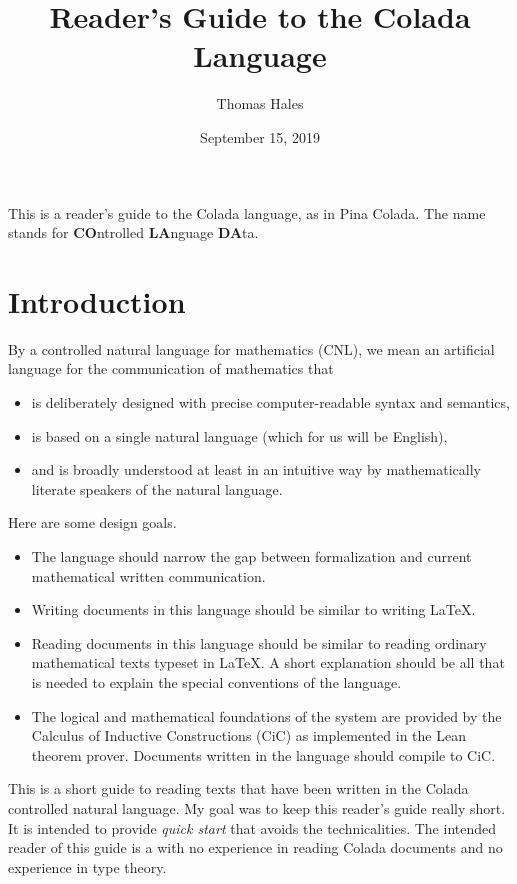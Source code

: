 \documentclass[12pt]{article}
\title{Reader's Guide to the Colada Language}
\date{September 15, 2019}
\author{Thomas Hales}
\numberwithin{definition}{section}
\begin{document}
\maketitle

\setcounter{tocdepth}{1}
\tableofcontents
\newpage

\newcommand{\Nat}{{\mathbb N}}
\newcommand{\Int}{{\mathbb Z}}
\newcommand{\Real}{{\mathbb R}}

This is a reader's guide to the Colada language, as in Pina Colada.  The name
stands for {\bf CO}ntrolled {\bf LA}nguage {\bf DA}ta.

\section{Introduction}


By a controlled natural language for mathematics (CNL), we mean an
artificial language for the communication of mathematics that
\begin{itemize}
\item is deliberately designed with precise computer-readable syntax
  and semantics,
\item is based on a single natural language (which for us will be
  English),
\item and is broadly understood at least in an intuitive way by
  mathematically literate speakers of the natural language.
\end{itemize}




Here are some design goals.
\begin{itemize}
\item The language should narrow the gap between formalization and
  current mathematical written communication.
\item Writing documents in this language should be similar to writing
  \LaTeX.
\item Reading documents in this language should be similar to reading
  ordinary mathematical texts typeset in \LaTeX.  A short explanation
  should be all that is needed to explain the special conventions of
  the language.
\item The logical and mathematical foundations of the system are
  provided by the Calculus of Inductive Constructions (CiC) as
  implemented in the Lean theorem prover.  Documents written in the
  language should compile to CiC.
\end{itemize}


This is a short guide to reading texts that have been written in the
Colada controlled natural language.  My goal was to keep this reader's
guide really short.  It is intended to provide \emph{quick start} that
avoids the technicalities.  The intended reader of this guide is a
with no experience in reading Colada documents and no experience in type theory.
\end{document}
